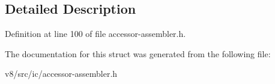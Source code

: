 \subsection{Detailed Description}


Definition at line 100 of file accessor-\/assembler.\+h.



The documentation for this struct was generated from the following file\+:\begin{DoxyCompactItemize}
\item 
v8/src/ic/accessor-\/assembler.\+h\end{DoxyCompactItemize}
